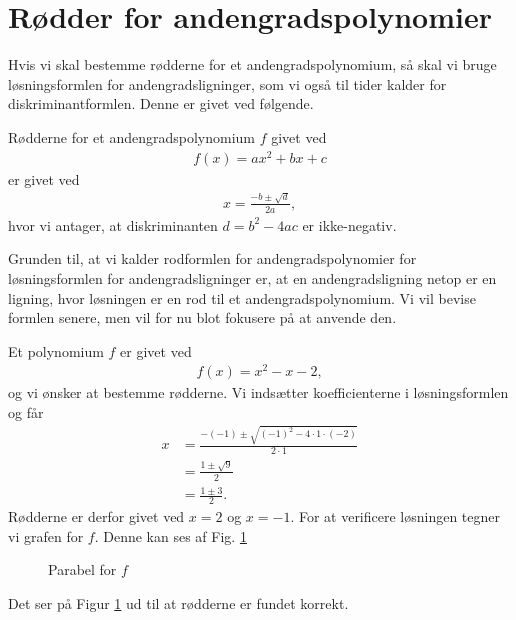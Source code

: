 \section*{Rødder for andengradspolynomier}

Hvis vi skal bestemme rødderne for et andengradspolynomium, så skal vi bruge løsningsformlen for andengradsligninger, som vi også til tider kalder for diskriminantformlen. Denne er givet ved følgende. 
\begin{setn}
	Rødderne for et andengradspolynomium $f$ givet ved
	\begin{align*}
		f(x) = ax^2+bx+c
	\end{align*}
	er givet ved
	\begin{align*}
		x = \frac{-b \pm \sqrt{d}}{2a},
	\end{align*}
	hvor vi antager, at diskriminanten $d = b^2 - 4ac$ er ikke-negativ.
\end{setn}
Grunden til, at vi kalder rodformlen for andengradspolynomier for løsningsformlen for andengradsligninger er, at en andengradsligning netop er en ligning, hvor løsningen er en rod til et andengradspolynomium. Vi vil bevise formlen senere, men vil for nu blot fokusere på at anvende den. 
\begin{exa}
	Et polynomium $f$ er givet ved
	\begin{align*}
		f(x) = x^2 - x - 2,
	\end{align*}
	og vi ønsker at bestemme rødderne. Vi indsætter koefficienterne i løsningsformlen og får
	\begin{align*}
		x &= \frac{-(-1) \pm \sqrt{(-1)^2-4\cdot 1 \cdot (-2)}}{2\cdot 1}\\
		&= \frac{1\pm \sqrt{9}}{2}\\
		&= \frac{1\pm 3}{2}.
	\end{align*}
	Rødderne er derfor givet ved $x = 2$ og $x = -1$. For at verificere løsningen tegner vi grafen for $f$. Denne kan ses af Fig. \ref{fig:rødder}
	\begin{figure}[H]
		\centering
		\caption{Parabel for $f$}
		\label{fig:rødder}
	\end{figure}
	Det ser på Figur \ref{fig:rødder} ud til at rødderne er fundet korrekt.
\end{exa}
